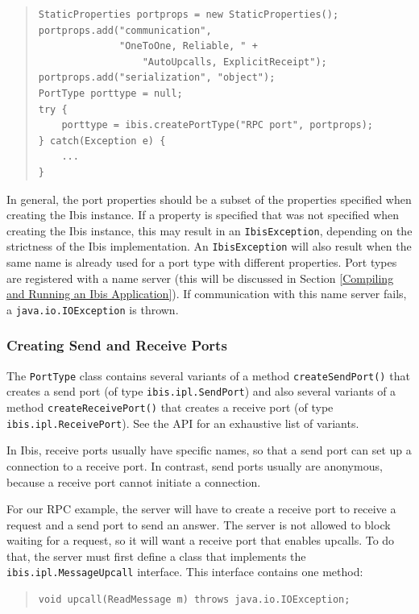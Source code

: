 \documentclass[10pt]{article}
\begin{document}
{\small
\begin{quote}
\begin{verbatim}
StaticProperties portprops = new StaticProperties();
portprops.add("communication",
              "OneToOne, Reliable, " + 
                  "AutoUpcalls, ExplicitReceipt");
portprops.add("serialization", "object");
PortType porttype = null;
try {
    porttype = ibis.createPortType("RPC port", portprops);
} catch(Exception e) {
    ...
}
\end{verbatim}
\end{quote}
}
\noindent
In general, the port properties should be a subset of the properties
specified when creating the Ibis instance. If a property is specified
that was not specified when creating the Ibis instance, this may
result in an \texttt{IbisException}, depending on the strictness of the
Ibis implementation.
An \texttt{IbisException} will also result when the same name is
already used for a port type with different properties.
Port types are registered with a name server
(this will be discussed in Section \ref{Compiling and Running an Ibis Application}).
If communication with this name server fails, a
\texttt{java.io.IOException} is thrown.

\subsubsection{Creating Send and Receive Ports}

The \texttt{PortType} class contains several variants of a method
\texttt{createSendPort()} that creates a send port (of type
\texttt{ibis.ipl.SendPort}) and
also several variants of a method \texttt{createReceivePort()} that
creates a receive port (of type \texttt{ibis.ipl.ReceivePort}).
See the API for an exhaustive list of variants.

In Ibis, receive ports usually have specific names, so that
a send port can set up a connection to a receive port. In contrast,
send ports usually are anonymous, because a receive port cannot
initiate a connection.

For our RPC example, the server will have to create a receive port
to receive a request and a send port to send an answer.
The server is not allowed to block waiting for a request, so it will
want a receive port that enables upcalls.
To do that, the server must first define a class that implements
the \texttt{ibis.ipl.MessageUpcall} interface. This interface contains one
method:

{\small
\begin{quote}
\begin{verbatim}
void upcall(ReadMessage m) throws java.io.IOException;
\end{verbatim}
\end{quote}
}
\end{document}
